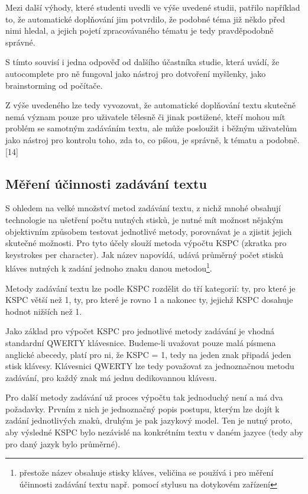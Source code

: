 \documentclass[a4paper,11pt]{article}
\begin{document}
Mezi další výhody, které studenti uvedli ve výše uvedené studii, patřilo například to, že automatické doplňování jim potvrdilo, že podobné téma již někdo před nimi hledal, a jejich pojetí zpracovávaného tématu je tedy pravděpodobně správné. 

S tímto souvisí i jedna odpověď od dalšího účastníka studie, která uvádí, že autocomplete pro ně fungoval jako nástroj pro dotvoření myšlenky, jako brainstorming od počítače. 

Z výše uvedeného lze tedy vyvozovat, že automatické doplňování textu skutečně nemá význam pouze pro uživatele tělesně či jinak postižené, kteří mohou mít problém se samotným zadáváním textu, ale může posloužit i běžným uživatelům jako nástroj pro kontrolu toho, zda to, co píšou, je správně, k tématu a podobně. [14]

\subsection{Měření účinnosti zadávání textu}

S ohledem na velké množství metod zadávání textu, z nichž mnohé obsahují technologie na ušetření počtu nutných stisků, je nutné mít možnost nějakým objektivním způsobem testovat jednotlivé metody, porovnávat je a zjistit jejich skutečné možnosti. Pro tyto účely slouží metoda výpočtu KSPC (zkratka pro keystrokes per character). Jak název napovídá, udává průměrný počet stisků kláves nutných k zadání jednoho znaku danou metodou\footnote{přestože název obsahuje stisky kláves, veličina se používá i pro měření účinnosti zadávání textu např. pomocí stylusu na dotykovém zařízení}.

Metody zadávání textu lze podle KSPC rozdělit do tří kategorií: ty, pro které je KSPC větší než 1, ty, pro které je rovno 1 a nakonec ty, jejichž KSPC dosahuje hodnot nižších než 1.

Jako základ pro výpočet KSPC pro jednotlivé metody zadávání je vhodná standardní QWERTY klávesnice. Budeme-li uvažovat pouze malá písmena anglické abecedy, platí pro ni, že KSPC = 1, tedy na jeden znak připadá jeden stisk klávesy. Klávesnici QWERTY lze tedy považovat za jednoznačnou metodu zadávání, pro každý znak má jednu dedikovannou klávesu.

Pro další metody zadávání už proces výpočtu tak jednoduchý není a má dva požadavky. Prvním z nich je jednoznačný popis postupu, kterým lze dojít k zadání jednotlivých znaků, druhým je pak jazykový model. Ten je nutný proto, aby výsledné KSPC bylo nezávislé na konkrétním textu v daném jazyce (tedy aby pro daný jazyk bylo průměrné).
\end{document}
